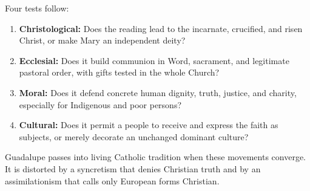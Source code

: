 Four tests follow:

\begin{enumerate}
  \item \textbf{Christological:} Does the reading lead to the incarnate, crucified, and risen Christ, or make Mary an independent deity?
  \item \textbf{Ecclesial:} Does it build communion in Word, sacrament, and legitimate pastoral order, with gifts tested in the whole Church?
  \item \textbf{Moral:} Does it defend concrete human dignity, truth, justice, and charity, especially for Indigenous and poor persons?
  \item \textbf{Cultural:} Does it permit a people to receive and express the faith as subjects, or merely decorate an unchanged dominant culture?
\end{enumerate}

Guadalupe passes into living Catholic tradition when these movements converge. It is distorted by a syncretism that denies Christian truth and by an assimilationism that calls only European forms Christian.

